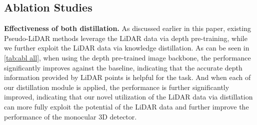 \documentclass[runningheads]{llncs}
\begin{document}
\begin{table}[t]
    \small
    \centering
        \caption{Effectiveness of both distillation and the extension to handle unlabeled data. 
        $Pre.$ denotes using depth pre-trained backbone.
        $Feat.$ denotes feature distillation. 
        $Res.$ denotes response distillation. 
        $Un.$ denotes distilling additional unlabeled data.}
    \label{tab:abl all}
\end{table}


\subsection{Ablation Studies}
\textbf{Effectiveness of both distillation.}
As discussed earlier in this paper, existing Pseudo-LiDAR methods \cite{PL,PL++,AMOD,monopl} leverage the LiDAR data via depth pre-training,
while we further exploit the LiDAR data via knowledge distillation.
As can be seen in \cref{tab:abl all}, when using the depth pre-trained image backbone, the performance significantly improves against the baseline, indicating that the accurate depth information provided by LiDAR points is helpful for the task.
And when each of our distillation module is applied, the performance is further significantly improved, indicating that our novel utilization of the LiDAR data via distillation can more fully exploit the potential of the LiDAR data and further improve the performance of the monocular 3D detector.
\end{document}
